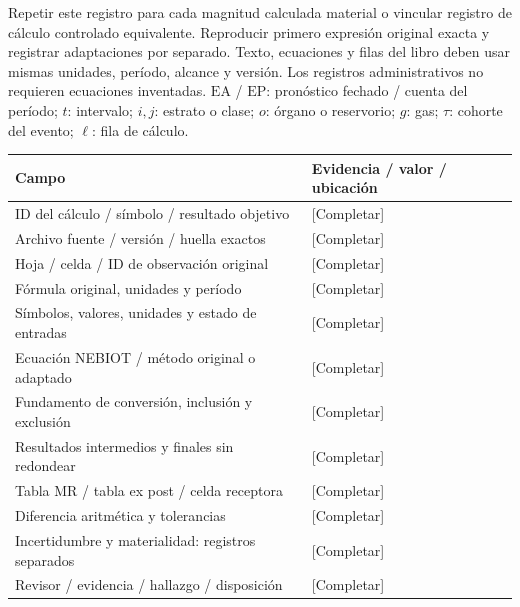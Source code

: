 Repetir este registro para cada magnitud calculada material o vincular registro de cálculo controlado equivalente. Reproducir primero expresión original exacta y registrar adaptaciones por separado. Texto, ecuaciones y filas del libro deben usar mismas unidades, período, alcance y versión. Los registros administrativos no requieren ecuaciones inventadas.
$\mathrm{EA}$ / $\mathrm{EP}$: pronóstico fechado / cuenta del período; $t$: intervalo; $i,j$: estrato o clase; $o$: órgano o reservorio; $g$: gas; $\tau$: cohorte del evento; $\ell$: fila de cálculo.
{\sffamily\fontsize{8.6}{10.7}\selectfont\begin{longtable}{@{}P{82mm}P{82mm}@{}}
\toprule
\textbf{Campo} & \textbf{Evidencia / valor / ubicación}\\\midrule\endhead
\rule{0pt}{8mm}ID del cálculo / símbolo / resultado objetivo & [Completar]\\\hline
\rule{0pt}{8mm}Archivo fuente / versión / huella exactos & [Completar]\\\hline
\rule{0pt}{8mm}Hoja / celda / ID de observación original & [Completar]\\\hline
\rule{0pt}{8mm}Fórmula original, unidades y período & [Completar]\\\hline
\rule{0pt}{8mm}Símbolos, valores, unidades y estado de entradas & [Completar]\\\hline
\rule{0pt}{8mm}Ecuación NEBIOT / método original o adaptado & [Completar]\\\hline
\rule{0pt}{8mm}Fundamento de conversión, inclusión y exclusión & [Completar]\\\hline
\rule{0pt}{8mm}Resultados intermedios y finales sin redondear & [Completar]\\\hline
\rule{0pt}{8mm}Tabla MR / tabla ex post / celda receptora & [Completar]\\\hline
\rule{0pt}{8mm}Diferencia aritmética y tolerancias & [Completar]\\\hline
\rule{0pt}{8mm}Incertidumbre y materialidad: registros separados & [Completar]\\\hline
\rule{0pt}{8mm}Revisor / evidencia / hallazgo / disposición & [Completar]\\\hline
\end{longtable}}
